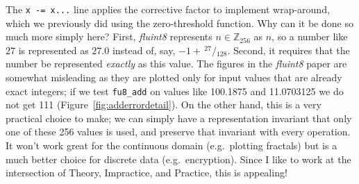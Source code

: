 \documentclass[twocolumn]{article}
\newcommand\sfrac[2]{\!{}\,^{#1}\!/{}\!_{#2}}
\begin{document}
The \verb|x -= x...| line applies the corrective factor to implement
wrap-around, which we previously did using the zero-threshold function.
Why can it be done so much more simply here? First, {\it fluint8}
represents $n \in \mathbb{Z}_{256}$ as $n$, so a number like $27$ is
represented as $27.0$ instead of, say, $-1 + \sfrac{27}{128}$.
Second, it
requires that the number be represented {\em exactly} as this value.
The figures in the {\it fluint8} paper are somewhat misleading as they are plotted
only for input values that are already exact integers; if we test
\verb+fu8_add+ on values like 100.1875 and 11.0703125 we do not get
111 (Figure~\ref{fig:adderrordetail}). On the other hand, this is a
very practical choice to make; we can simply have a representation
invariant that only one of these 256 values is used, and preserve that
invariant with every operation. It won't work great for the continuous
domain (e.g.~plotting fractals) but is a much better choice for
discrete data (e.g.~encryption).
Since I like to work at the intersection of Theory, Impractice, and Practice,
this is appealing!
\end{document}
